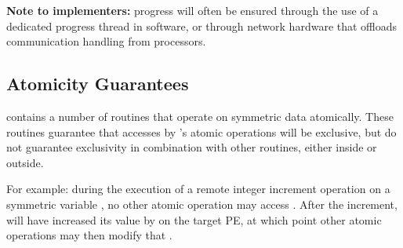 \textbf{Note to implementers:} progress will often be ensured through
the use of a dedicated progress thread in software, or through
network hardware that offloads communication handling from processors.



\subsection{Atomicity Guarantees}

\openshmem contains a number of routines that operate on symmetric data
atomically.  These routines guarantee that accesses by \openshmem's
atomic operations will be exclusive, but do not guarantee exclusivity
in combination with other routines, either inside \openshmem or
outside.

For example: during the execution of a remote integer increment
operation on a symmetric variable , no other \openshmem atomic
operation may access .  After the increment,  will have
increased its value by  on the target \ac{PE}, at which point other
atomic operations may then modify that .

